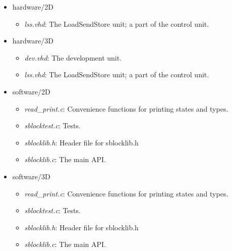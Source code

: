 \begin{itemize}
    \item hardware/2D
    \begin{itemize}
        \item \emph{lss.vhd}: The LoadSendStore unit; a part of the control unit.
    \end{itemize}
    \item hardware/3D
    \begin{itemize}
        \item \emph{dev.vhd}: The development unit.
        \item \emph{lss.vhd}: The LoadSendStore unit; a part of the control unit.
    \end{itemize}
    \item software/2D
    \begin{itemize}
        \item \emph{read\_print.c}: Convenience functions for printing states and types.
        \item \emph{sblocktest.c}: Tests.
        \item \emph{sblocklib.h}: Header file for sblocklib.h
        \item \emph{sblocklib.c}: The main API.
    \end{itemize}
    \item software/3D
    \begin{itemize}
        \item \emph{read\_print.c}: Convenience functions for printing states and types.
        \item \emph{sblocktest.c}: Tests.
        \item \emph{sblocklib.h}: Header file for sblocklib.h
        \item \emph{sblocklib.c}: The main API.
    \end{itemize}
\end{itemize}


